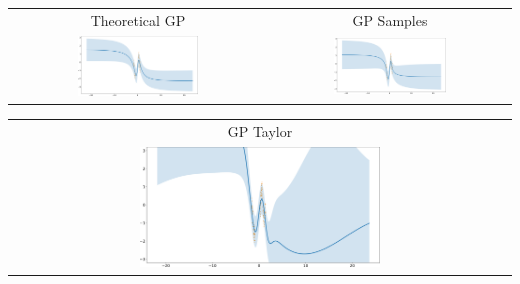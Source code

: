     \begin{frame}
        \begin{center}
        \begin{tabular}{ c c }
         Theoretical GP & GP Samples \\ 
         \includegraphics[width=0.49\textwidth]{imgs/Exact_GP.pdf} & \includegraphics[width=0.49\textwidth]{imgs/Exact_GP_moments.pdf}\\  
        \end{tabular}
        \end{center}
        \begin{center}
        \begin{tabular}{ c}
         GP Taylor \\ 
         \includegraphics[width=0.49\textwidth]{imgs/Exact_GP_taylor.pdf}\\  
        \end{tabular}
        \end{center}
    \end{frame}